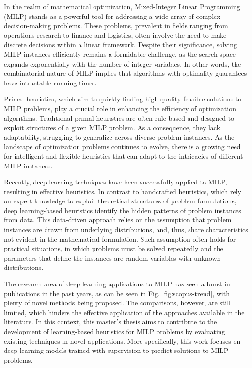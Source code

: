 In the realm of mathematical optimization, Mixed-Integer Linear Programming (MILP) stands as a powerful tool for addressing a wide array of complex decision-making problems.
These problems, prevalent in fields ranging from operations research to finance and logistics, often involve the need to make discrete decisions within a linear framework.
Despite their significance, solving MILP instances efficiently remains a formidable challenge, as the search space expands exponentially with the number of integer variables.
In other words, the combinatorial nature of MILP implies that algorithms with optimality guarantees have intractable running times.

Primal heuristics, which aim to quickly finding high-quality feasible solutions to MILP problems, play a crucial role in enhancing the efficiency of optimization algorithms.
Traditional primal heuristics are often rule-based and designed to exploit structures of a given MILP problem.
As a consequence, they lack adaptability, struggling to generalize across diverse problem instances.
As the landscape of optimization problems continues to evolve, there is a growing need for intelligent and flexible heuristics that can adapt to the intricacies of different MILP instances.

Recently, deep learning techniques have been successfully applied to MILP, resulting in effective heuristics.
In contrast to handcrafted heuristics, which rely on expert knowledge to exploit theoretical structures of problem formulations, deep learning-based heuristics identify the hidden patterns of problem instances from data.
This data-driven approach relies on the assumption that problem instances are drawn from underlying distributions, and, thus, share characteristics not evident in the mathematical formulation.
Such assumption often holds for practical situations, in which problems must be solved repeatedly and the parameters that define the instances are random variables with unknown distributions.

The research area of deep learning applications to MILP has seen a burst in publications in the past years, as can be seen in Fig. \ref{fig:scopus-trend}, with plenty of novel methods being proposed.
The comparisons, however, are still limited, which hinders the effective application of the approaches available in the literature.
In this context, this master's thesis aims to contribute to the development of learning-based heuristics for MILP problems by evaluating existing techniques in novel applications.
More specifically, this work focuses on deep learning models trained with supervision to predict solutions to MILP problems.

